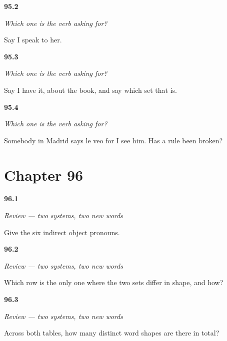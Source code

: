 \noindent\begin{minipage}[t]{\linewidth}
\raggedright
\hypertarget{review-ES-C46-cual-pide-speak}{\textbf{95.2}} \emph{Which one is the verb asking for?}\par
\small Say I speak to her.
\end{minipage}\par\medskip

\noindent\begin{minipage}[t]{\linewidth}
\raggedright
\hypertarget{review-ES-C46-cual-pide-have}{\textbf{95.3}} \emph{Which one is the verb asking for?}\par
\small Say I have it, about the book, and say which set that is.
\end{minipage}\par\medskip

\noindent\begin{minipage}[t]{\linewidth}
\raggedright
\hypertarget{review-ES-C46-cual-pide-leismo}{\textbf{95.4}} \emph{Which one is the verb asking for?}\par
\small Somebody in Madrid says le veo for I see him. Has a rule been broken?
\end{minipage}\par\medskip

\section*{Chapter 96}

\noindent\begin{minipage}[t]{\linewidth}
\raggedright
\hypertarget{review-ES-C46-repaso-dos-sistemas-indirect}{\textbf{96.1}} \emph{Review — two systems, two new words}\par
\small Give the six indirect object pronouns.
\end{minipage}\par\medskip

\noindent\begin{minipage}[t]{\linewidth}
\raggedright
\hypertarget{review-ES-C46-repaso-dos-sistemas-row}{\textbf{96.2}} \emph{Review — two systems, two new words}\par
\small Which row is the only one where the two sets differ in shape, and how?
\end{minipage}\par\medskip

\noindent\begin{minipage}[t]{\linewidth}
\raggedright
\hypertarget{review-ES-C46-repaso-dos-sistemas-count}{\textbf{96.3}} \emph{Review — two systems, two new words}\par
\small Across both tables, how many distinct word shapes are there in total?
\end{minipage}\par\medskip

